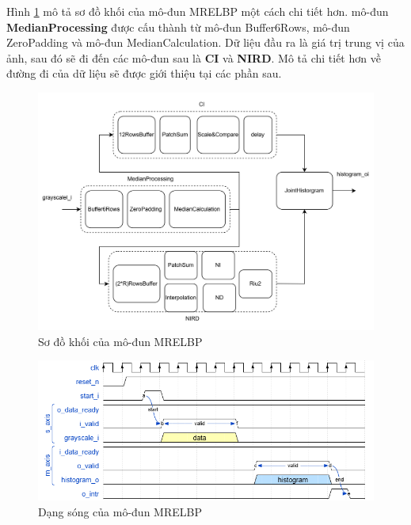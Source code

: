 Hình \ref{fig:mrelbpArchitecture} mô tả sơ đồ khối của mô-đun MRELBP một cách chi tiết hơn. mô-đun \textbf{MedianProcessing} được cấu thành từ mô-đun Buffer6Rows, mô-đun ZeroPadding và mô-đun MedianCalculation. Dữ liệu đầu ra là giá trị trung vị của ảnh, sau đó sẽ đi đến các mô-đun sau là \textbf{CI} và \textbf{NIRD}. Mô tả chi tiết hơn về đường đi của dữ liệu sẽ được giới thiệu tại các phần sau.
\begin{figure} [!ht]
	\centering
\includegraphics[width=1\linewidth]{figures/mrelbpArchitecture.png}
	\caption{Sơ đồ khối của mô-đun MRELBP}
	\label{fig:mrelbpArchitecture}
\end{figure}



\begin{figure} [!ht]
	\centering
\includegraphics[width=1\linewidth]{figures/mrelbp.png}
	\caption{Dạng sóng của mô-đun MRELBP}
	\label{fig:mrelbpWaveform}
\end{figure}




\newpage
